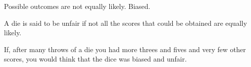 Possible outcomes are not equally likely. Biased. 
\par
A die is said to be unfair if not all the scores that could be obtained are equally likely. 
\par
If, after many throws of a die you had more threes and fives and very few other scores, you would think that the dice was biased and unfair.
